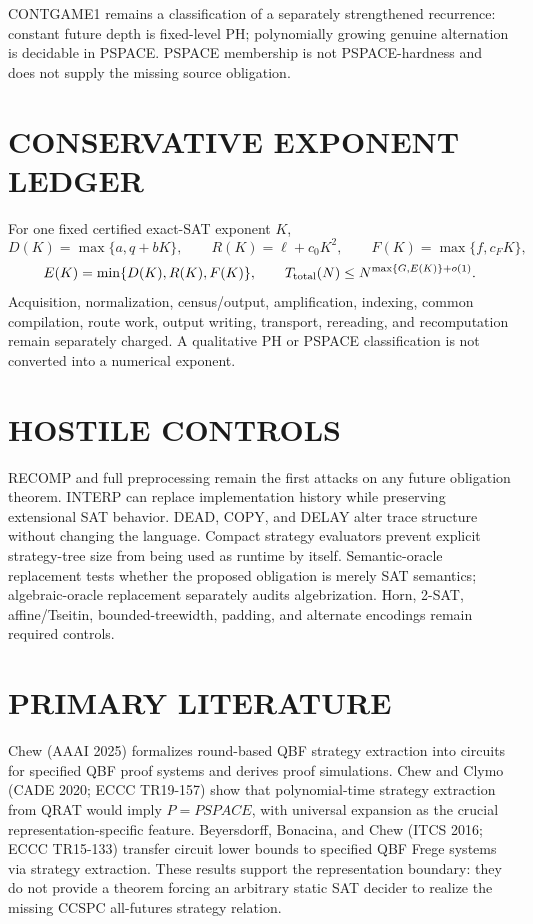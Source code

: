 \documentclass[11pt]{article}
\begin{document}
CONTGAME1 remains a classification of a separately strengthened recurrence: constant future depth is fixed-level PH; polynomially growing genuine alternation is decidable in PSPACE. PSPACE membership is not PSPACE-hardness and does not supply the missing source obligation.

\section*{CONSERVATIVE EXPONENT LEDGER}
For one fixed certified exact-SAT exponent $K$,
\[
D(K)=\max\{a,q+bK\},\qquad
R(K)=\ell+c_0K^2,\qquad
F(K)=\max\{f,c_FK\},
\]
\[
E(K)=\min\{D(K),R(K),F(K)\},
\qquad
T_{\rm total}(N)\le N^{\max\{G,E(K)\}+o(1)}.
\]
Acquisition, normalization, census/output, amplification, indexing, common compilation, route work, output writing, transport, rereading, and recomputation remain separately charged. A qualitative PH or PSPACE classification is not converted into a numerical exponent.

\section*{HOSTILE CONTROLS}
RECOMP and full preprocessing remain the first attacks on any future obligation theorem. INTERP can replace implementation history while preserving extensional SAT behavior. DEAD, COPY, and DELAY alter trace structure without changing the language. Compact strategy evaluators prevent explicit strategy-tree size from being used as runtime by itself. Semantic-oracle replacement tests whether the proposed obligation is merely SAT semantics; algebraic-oracle replacement separately audits algebrization. Horn, 2-SAT, affine/Tseitin, bounded-treewidth, padding, and alternate encodings remain required controls.

\section*{PRIMARY LITERATURE}
Chew (AAAI 2025) formalizes round-based QBF strategy extraction into circuits for specified QBF proof systems and derives proof simulations. Chew and Clymo (CADE 2020; ECCC TR19-157) show that polynomial-time strategy extraction from QRAT would imply $P=PSPACE$, with universal expansion as the crucial representation-specific feature. Beyersdorff, Bonacina, and Chew (ITCS 2016; ECCC TR15-133) transfer circuit lower bounds to specified QBF Frege systems via strategy extraction. These results support the representation boundary: they do not provide a theorem forcing an arbitrary static SAT decider to realize the missing CCSPC all-futures strategy relation.
\end{document}
